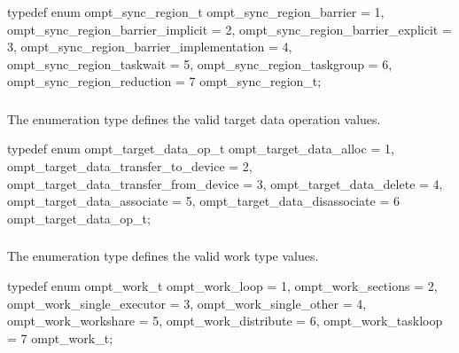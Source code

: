\format
\begin{ccppspecific}
\begin{omptEnum}
typedef enum ompt_sync_region_t {
  ompt_sync_region_barrier                = 1,
  ompt_sync_region_barrier_implicit       = 2,
  ompt_sync_region_barrier_explicit       = 3,
  ompt_sync_region_barrier_implementation = 4,
  ompt_sync_region_taskwait               = 5,
  ompt_sync_region_taskgroup              = 6,
  ompt_sync_region_reduction              = 7
} ompt_sync_region_t;
\end{omptEnum}
\end{ccppspecific}



\subsubsection{}
\label{sec:ompt_target_data_op_t}

\summary
The  enumeration type defines the valid target 
data operation values.

\format
\begin{ccppspecific}
\begin{omptEnum}
typedef enum ompt_target_data_op_t {
  ompt_target_data_alloc                = 1,
  ompt_target_data_transfer_to_device   = 2,
  ompt_target_data_transfer_from_device = 3,
  ompt_target_data_delete               = 4,
  ompt_target_data_associate            = 5,
  ompt_target_data_disassociate         = 6
} ompt_target_data_op_t;
\end{omptEnum}
\end{ccppspecific}



\subsubsection{}
\label{sec:ompt_work_t}

\summary
The  enumeration type defines the valid work type values.

\format
\begin{ccppspecific}
\begin{omptEnum}
typedef enum ompt_work_t {
  ompt_work_loop               = 1,
  ompt_work_sections           = 2,
  ompt_work_single_executor    = 3,
  ompt_work_single_other       = 4,
  ompt_work_workshare          = 5,
  ompt_work_distribute         = 6,
  ompt_work_taskloop           = 7
} ompt_work_t;
\end{omptEnum}
\end{ccppspecific}



